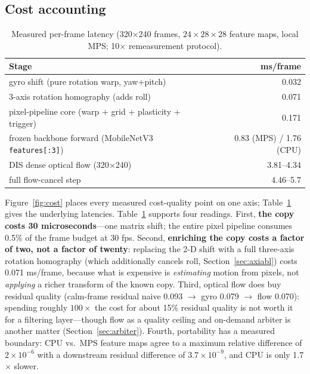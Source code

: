 \documentclass[12pt,a4paper]{article}
\begin{document}
\subsection{Cost accounting}

\begin{table}[htbp]
  \centering
  \small
  \caption{Measured per-frame latency (320$\times$240 frames, $24{\times}28{\times}28$ feature maps, local MPS; 10$\times$ remeasurement protocol).}
  \label{tab:cost}
  \begin{tabular}{lr}
    \toprule
    Stage & ms/frame \\
    \midrule
    gyro shift (pure rotation warp, yaw$+$pitch) & 0.032 \\
    3-axis rotation homography (adds roll) & 0.071 \\
    pixel-pipeline core (warp + grid + plasticity + trigger) & 0.171 \\
    frozen backbone forward (MobileNetV3 \texttt{features[:3]}) & 0.83 (MPS) / 1.76 (CPU) \\
    DIS dense optical flow (320$\times$240)~\cite{dis2016} & 3.81--4.34 \\
    full flow-cancel step & 4.46--5.7 \\
    \bottomrule
  \end{tabular}
\end{table}

Figure~\ref{fig:cost} places every measured cost-quality point on one axis; Table~\ref{tab:cost} gives the underlying latencies. Table~\ref{tab:cost} supports four readings. First, \textbf{the copy costs 30 microseconds}---one matrix shift; the entire pixel pipeline consumes 0.5\% of the frame budget at 30 fps. Second, \textbf{enriching the copy costs a factor of two, not a factor of twenty}: replacing the 2-D shift with a full three-axis rotation homography (which additionally cancels roll, Section~\ref{sec:axiabl}) costs 0.071 ms/frame, because what is expensive is \emph{estimating} motion from pixels, not \emph{applying} a richer transform of the known copy. Third, optical flow does buy residual quality (calm-frame residual naive 0.093 $\to$ gyro 0.079 $\to$ flow 0.070): spending roughly $100\times$ the cost for about 15\% residual quality is not worth it for a filtering layer---though flow as a quality ceiling and on-demand arbiter is another matter (Section~\ref{sec:arbiter}). Fourth, portability has a measured boundary: CPU vs.\ MPS feature maps agree to a maximum relative difference of $2{\times}10^{-6}$ with a downstream residual difference of $3.7{\times}10^{-9}$, and CPU is only 1.7$\times$ slower.
\end{document}
